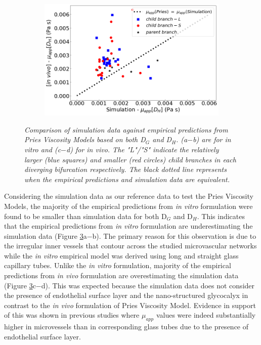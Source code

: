 \begin{figure}[H]
\begin{subfigure}{0.48 \textwidth}
    \caption{\textit{} \label{InVivoApparentViscosityDG}}
\end{subfigure}
\hfill
\begin{subfigure}{0.48 \textwidth}
    \includegraphics[width=1\textwidth]{images/InVivoApparentViscosityDH.png}
    \caption{\textit{} \label{InVivoApparentViscosityDH}}
\end{subfigure}
\caption{\textit{Comparison of simulation data against empirical predictions from Pries Viscosity Models based on both D$_{G}$ and D$_{H}$. (a$-$b) are for \textit{in vitro} and (c$-$d) for \textit{in vivo}. The "L"/"S" indicate the relatively larger (blue squares) and smaller (red circles) child branches in each diverging bifurcation respectively. The black dotted line represents when the empirical predictions and simulation data are equivalent.} \label{PriesViscosityModels}}
\end{figure}


\noindent Considering the simulation data as our reference data to test the Pries Viscosity Models, the majority of the empirical predictions from \textit{in vitro} formulation were found to be smaller than simulation data for both D$_{G}$ and D$_{H}$. This indicates that the empirical predictions from \textit{in vitro} formulation are underestimating the simulation data (Figure \ref{PriesViscosityModels}a$-$b). The primary reason for this observation is due to the irregular inner vessels that contour across the studied microvascular networks while the \textit{in vitro} empirical model was derived using long and straight glass capillary tubes. Unlike the \textit{in vitro} formulation, majority of the empirical predictions from \textit{in vivo} formulation are overestimating the simulation data (Figure \ref{PriesViscosityModels}c$-$d). This was expected because the simulation data does not consider the presence of endothelial surface layer and the nano-structured glycocalyx in contrast to the \textit{in vivo} formulation of Pries Viscosity Model.\cite{PriesAR1994RtBF} Evidence in support of this was shown in previous studies\cite{LIPOWSKY1977345, LIPOWSKY1980297, SECOMB2013470, PriesAR1994RtBF} where $\mu_{app}$ values were indeed substantially higher in microvessels than in corresponding glass tubes due to the presence of endothelial surface layer. 


